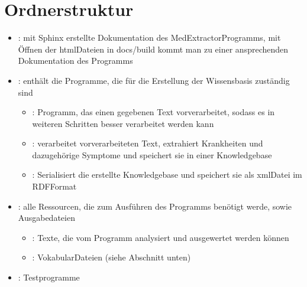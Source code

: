 \documentclass[letterpaper,10pt,english]{sphinxmanual}
\begin{document}
\chapter{Ordnerstruktur}
\label{\detokenize{readme:ordnerstruktur}}\begin{itemize}
\item {} 
\sphinxAtStartPar
{}: mit Sphinx erstellte Dokumentation des
MedExtractor\sphinxhyphen{}Programms, mit Öffnen der html\sphinxhyphen{}Dateien in docs/build
kommt man zu einer ansprechenden Dokumentation des Programms

\item {} 
\sphinxAtStartPar
{}: enthält die Programme, die für die Erstellung der
Wissensbasis zuständig sind
\begin{itemize}
\item {} 
\sphinxAtStartPar
{}: Programm, das einen gegebenen Text
vorverarbeitet, sodass es in weiteren Schritten besser verarbeitet
werden kann

\item {} 
\sphinxAtStartPar
{}: verarbeitet vorverarbeiteten Text, extrahiert
Krankheiten und dazugehörige Symptome und speichert sie in einer
Knowledgebase

\item {} 
\sphinxAtStartPar
{}: Serialisiert die erstellte Knowledgebase und speichert
sie als xml\sphinxhyphen{}Datei im RDF\sphinxhyphen{}Format

\end{itemize}

\item {} 
\sphinxAtStartPar
{}: alle Ressourcen, die zum Ausführen des Programms
benötigt werde, sowie Ausgabedateien
\begin{itemize}
\item {} 
\sphinxAtStartPar
{}: Texte, die vom Programm analysiert und ausgewertet
werden können

\item {} 
\sphinxAtStartPar
{}: Vokabular\sphinxhyphen{}Dateien (siehe Abschnitt unten)

\end{itemize}

\item {} 
\sphinxAtStartPar
{}: Testprogramme

\end{itemize}
\end{document}
